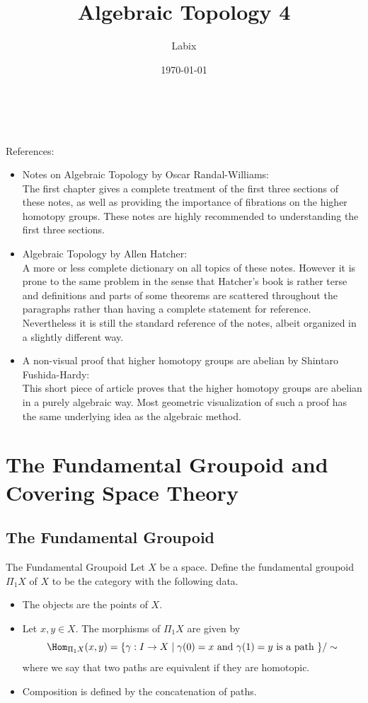 \documentclass[a4paper]{article}
\title{Algebraic Topology 4}
\author{Labix}
\date{\today}
\begin{document}
\maketitle
\begin{abstract}
\end{abstract}
~\\~\\
References: 
\begin{itemize}
\item Notes on Algebraic Topology by Oscar Randal-Williams: \\
The first chapter gives a complete treatment of the first three sections of these notes, as well as providing the importance of fibrations on the higher homotopy groups. These notes are highly recommended to understanding the first three sections. 

\item Algebraic Topology by Allen Hatcher: \\
A more or less complete dictionary on all topics of these notes. However it is prone to the same problem in the sense that Hatcher's book is rather terse and definitions and parts of some theorems are scattered throughout the paragraphs rather than having a complete statement for reference. Nevertheless it is still the standard reference of the notes, albeit organized in a slightly different way. 

\item A non-visual proof that higher homotopy groups are abelian by Shintaro Fushida-Hardy: \\
This short piece of article proves that the higher homotopy groups are abelian in a purely algebraic way. Most geometric visualization of such a proof has the same underlying idea as the algebraic method. 
\end{itemize}

\pagebreak
\tableofcontents

\pagebreak
\section{The Fundamental Groupoid and Covering Space Theory}
\subsection{The Fundamental Groupoid}
\begin{defn}{The Fundamental Groupoid}{} Let $X$ be a space. Define the fundamental groupoid $\Pi_1X$ of $X$ to be the category with the following data. 
\begin{itemize}
\item The objects are the points of $X$. 
\item Let $x,y\in X$. The morphisms of $\Pi_1X$ are given by $$\Hom_{\Pi_1X}(x,y)=\{\gamma:I\to X\;|\;\gamma(0)=x\text{ and }\gamma(1)=y\text{ is a path }\}/\sim$$ where we say that two paths are equivalent if they are homotopic. 
\item Composition is defined by the concatenation of paths. 
\end{itemize}
\end{defn}
\end{document}
